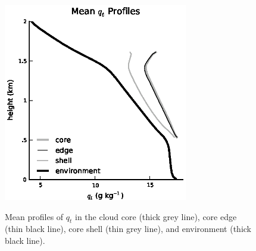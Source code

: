 \documentclass[12pt]{article}
\begin{document}
\begin{figure}[t]
  \noindent\includegraphics[width=19pc,angle=0]{./figures/shell_edge_profiles_core.eps}\\
  \caption{Mean profiles of $q_t$ in the cloud core (thick grey line), core 
edge (thin black line), core shell (thin grey line), and environment (thick 
black line).}\label{fig:shell_edge_profiles}
\end{figure}
\end{document}
